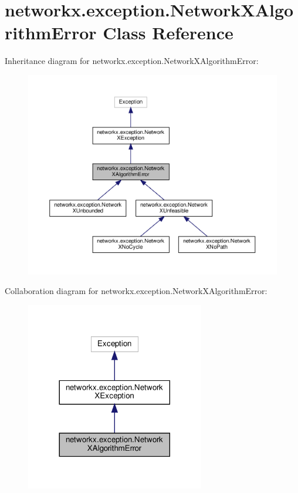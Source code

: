 \hypertarget{classnetworkx_1_1exception_1_1NetworkXAlgorithmError}{}\section{networkx.\+exception.\+Network\+X\+Algorithm\+Error Class Reference}
\label{classnetworkx_1_1exception_1_1NetworkXAlgorithmError}


Inheritance diagram for networkx.\+exception.\+Network\+X\+Algorithm\+Error\+:
\nopagebreak
\begin{figure}[H]
\begin{center}
\leavevmode
\includegraphics[width=350pt]{classnetworkx_1_1exception_1_1NetworkXAlgorithmError__inherit__graph}
\end{center}
\end{figure}


Collaboration diagram for networkx.\+exception.\+Network\+X\+Algorithm\+Error\+:
\nopagebreak
\begin{figure}[H]
\begin{center}
\leavevmode
\includegraphics[width=221pt]{classnetworkx_1_1exception_1_1NetworkXAlgorithmError__coll__graph}
\end{center}
\end{figure}


